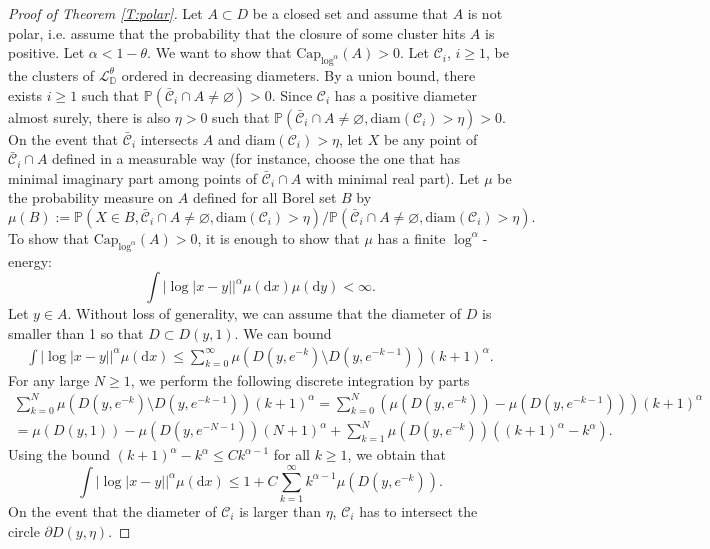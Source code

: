 \documentclass[11pt]{article}
\theoremstyle{remark}
\newcommand{\D}{\mathbb{D}}
\newcommand{\Cc}{\mathcal{C}}
\newcommand{\Lc}{\mathcal{L}}
\newcommand{\Prob}[1]{\mathbb{P} \left( #1 \right) }
\renewcommand{\d}{\mathrm{d}}
\renewcommand{\Cap}{\mathrm{Cap}}
\numberwithin{equation}{section}
\begin{document}
\begin{proof}[Proof of Theorem \ref{T:polar}]
Let $A \subset D$ be a closed set and assume that $A$ is not polar, i.e. assume that the probability that the closure of some cluster hits $A$ is positive. 
Let $\alpha < 1-\theta$. We want to show that $\Cap_{\log^\alpha}(A) > 0$.
Let $\Cc_i$, $i \geq 1$, be the clusters of $\Lc_\D^\theta$ ordered in decreasing diameters. By a union bound, there exists $i \geq 1$ such that $\Prob{\bar{\Cc}_i \cap A \neq \varnothing}>0$. Since $\Cc_i$ has a positive diameter almost surely, there is also $\eta >0$ such that $\Prob{\bar{\Cc}_i \cap A \neq \varnothing, \text{diam}(\Cc_i) > \eta }>0$. On the event that $\bar{\Cc}_i$ intersects $A$ and $\text{diam}(\Cc_i) > \eta$, let $X$ be any point of $\bar{\Cc}_i \cap A$ defined in a measurable way (for instance, choose the one that has minimal imaginary part among points of $\bar{\Cc}_i \cap A$ with minimal real part).
Let $\mu$ be the probability measure on $A$ defined for all Borel set $B$ by
\[
\mu(B) := \Prob{ X \in B, \bar{\Cc}_i \cap A \neq \varnothing, \text{diam}(\Cc_i)>\eta } / \Prob{ \bar{\Cc}_i \cap A \neq \varnothing, \text{diam}(\Cc_i)>\eta }.
\]
To show that $\Cap_{\log^\alpha}(A) >0$, it is enough to show that $\mu$ has a finite $\log^\alpha$-energy:
\begin{equation}
\label{E:polar1}
\int |\log |x-y||^\alpha \mu(\d x) \mu(\d y) < \infty.
\end{equation}
Let $y \in A$. Without loss of generality, we can assume that the diameter of $D$ is smaller than 1 so that $D \subset D(y,1)$. We can bound
\begin{align*}
\int |\log |x-y||^\alpha \mu(\d x)
\leq \sum_{k=0}^\infty \mu( D(y,e^{-k}) \setminus D(y,e^{-k-1}) ) (k+1)^{\alpha}.
\end{align*}
For any large $N \geq 1$, we perform the following discrete integration by parts
\begin{align*}
\sum_{k=0}^N \mu( D(y,e^{-k}) \setminus D(y,e^{-k-1}) ) (k+1)^{\alpha}
= \sum_{k=0}^N \left( \mu( D(y,e^{-k}) ) - \mu ( D(y,e^{-k-1}) ) \right) (k+1)^{\alpha} \\
= \mu( D(y,1) ) - \mu (D(y,e^{-N-1})) (N+1)^\alpha + \sum_{k=1}^N \mu( D(y,e^{-k})) ( (k+1)^\alpha - k^\alpha ).
\end{align*}
Using the bound $(k+1)^\alpha - k^\alpha \leq C k^{\alpha-1}$ for all $k \geq 1$, we obtain that
\[
\int |\log |x-y||^\alpha \mu(\d x)
\leq 1+ C \sum_{k=1}^\infty k^{\alpha-1} \mu ( D(y,e^{-k})).
\]
On the event that the diameter of $\Cc_i$ is larger than $\eta$, $\Cc_i$ has to intersect the circle $\partial D(y,\eta)$.

\end{proof}
\end{document}

